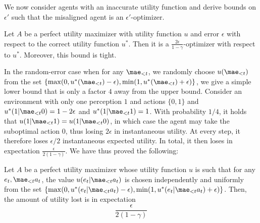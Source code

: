 We now consider agents with an inaccurate utility function and derive bounds on $\epsilon'$ such that the misaligned agent is an $\epsilon'$-optimizer. 

\begin{theorem} \label{thm:inaccurate_utility}
Let $A$ be a perfect utility maximizer with utility function $u$ and error $\epsilon$ with respect to the correct utility function $u^*$. Then it is a $\frac{2\epsilon}{1-\gamma}$-optimizer with respect to $u^*$. Moreover, this bound is tight.
\end{theorem}

In the random-error case when for any $\mae_{<t}$, we randomly choose $u(\mae_{<t})$ from the set $\{\max(0,u^*(\mae_{<t})-\epsilon), \min(1,u^*(\mae_{<t})+\epsilon)\}$, we give a simple lower bound that is only a factor $4$ away from the upper bound.
Consider an environment with only one perception $1$ and actions $\{0,1\}$ and $u^*(1|\mae_{<t}0) = 1-2\epsilon$ and $u^*(1|\mae_{<t}1) = 1$. With probability $1/4$, 
it holds that $u(1|\mae_{<t}1) = u(1|\mae_{<t}0)$, in which case the agent may take the suboptimal action $0$, thus losing $2\epsilon$ in instantaneous utility. At every step, it therefore loses $\epsilon/2$ instantaneous expected utility. In total, it then loses in expectation $\frac{\epsilon}{2(1-\gamma)}$. We have thus proved the following:

\begin{theorem}
Let $A$ be a perfect utility maximizer whose utility function $u$ is such that for any $e_t,\mae_{<t}a_t$, the value $u(e_t|\mae_{<t}a_t)$ is chosen independently and uniformly from the set $\{\max(0,u^*(e_t|\mae_{<t}a_t)-\epsilon), \min(1,u^*(e_t|\mae_{<t}a_t)+\epsilon)\}$. Then, the amount of utility lost is in expectation
\[
\frac{\epsilon}{2(1-\gamma)}
\]
\end{theorem}
